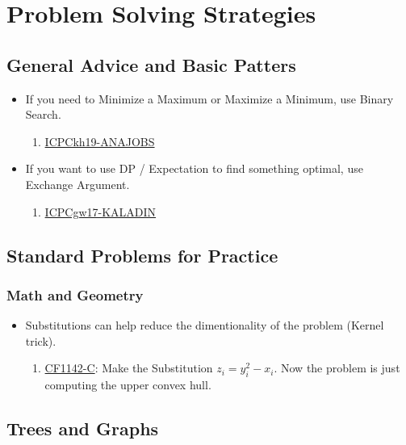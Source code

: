 \chapter{Problem Solving Strategies}


\section{General Advice and Basic Patters}

\begin{itemize}
    \item If you need to Minimize a Maximum or Maximize a Minimum, use Binary Search.
          \begin{enumerate}
              \item \href{https://www.codechef.com/KH19MOS/problems/ANAJOBS}{ICPCkh19-ANAJOBS}
          \end{enumerate}
    \item If you want to use DP / Expectation to find something optimal, use Exchange Argument.
          \begin{enumerate}
              \item \href{https://www.codechef.com/GWR17ROL/problems/KALADIN}{ICPCgw17-KALADIN}
          \end{enumerate}
\end{itemize}


\section{Standard Problems for Practice}

\subsection{Math and Geometry}

\begin{itemize}
    \item Substitutions can help reduce the dimentionality of the problem (Kernel trick).
          \begin{enumerate}
              \item \href{https://codeforces.com/problemset/problem/1142/C}{CF1142-C}: Make the Substitution $z_{i} = y_{i}^{2} - x_{i}$. Now the problem is just computing the upper convex hull.
          \end{enumerate}
\end{itemize}

\section{Trees and Graphs}

